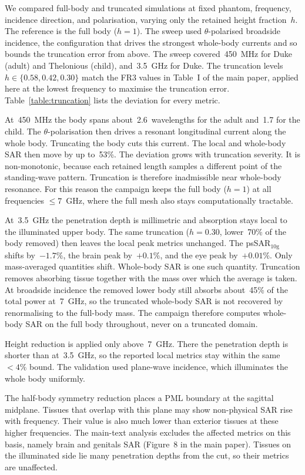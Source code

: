 \documentclass{iopjournal}
\begin{document}
We compared full-body and truncated simulations at fixed phantom, frequency, incidence direction, and polarisation, varying only the retained height fraction~$h$.
The reference is the full body ($h=1$).
The sweep used $\theta$-polarised broadside incidence, the configuration that drives the strongest whole-body currents and so bounds the truncation error from above.
The sweep covered~450~MHz for Duke (adult) and Thelonious (child), and~3.5~GHz for Duke.
The truncation levels $h \in \{0.58, 0.42, 0.30\}$ match the FR3 values in Table~I of the main paper, applied here at the lowest frequency to maximise the truncation error.
Table~\ref{table:truncation} lists the deviation for every metric.

At~450~MHz the body spans about~2.6~wavelengths for the adult and~1.7 for the child.
The $\theta$-polarisation then drives a resonant longitudinal current along the whole body.
Truncating the body cuts this current.
The local and whole-body \gls{SAR} then move by up to~53\%.
The deviation grows with truncation severity.
It is non-monotonic, because each retained length samples a different point of the standing-wave pattern.
Truncation is therefore inadmissible near whole-body resonance.
For this reason the campaign keeps the full body ($h=1$) at all frequencies $\le 7$~GHz, where the full mesh also stays computationally tractable.

At~3.5~GHz the penetration depth is millimetric and absorption stays local to the illuminated upper body.
The same truncation ($h=0.30$, lower~70\% of the body removed) then leaves the local peak metrics unchanged.
The psSAR$_{10\mathrm{g}}$ shifts by~$-1.7\%$, the brain peak by~$+0.1\%$, and the eye peak by~$+0.01\%$.
Only mass-averaged quantities shift.
Whole-body \gls{SAR} is one such quantity.
Truncation removes absorbing tissue together with the mass over which the average is taken.
At broadside incidence the removed lower body still absorbs about~45\% of the total power at~7~GHz, so the truncated whole-body \gls{SAR} is not recovered by renormalising to the full-body mass.
The campaign therefore computes whole-body \gls{SAR} on the full body throughout, never on a truncated domain.

Height reduction is applied only above~7~GHz.
There the penetration depth is shorter than at~3.5~GHz, so the reported local metrics stay within the same~$<4\%$ bound.
The validation used plane-wave incidence, which illuminates the whole body uniformly.

The half-body symmetry reduction places a \gls{PML} boundary at the sagittal midplane.
Tissues that overlap with this plane may show non-physical \gls{SAR} rise with frequency. Their value is also much lower than exterior tissues at these higher frequencies.
The main-text analysis excludes the affected metrics on this basis, namely brain and genitals \gls{SAR} (Figure~8 in the main paper).
Tissues on the illuminated side lie many penetration depths from the cut, so their metrics are unaffected.
\end{document}
